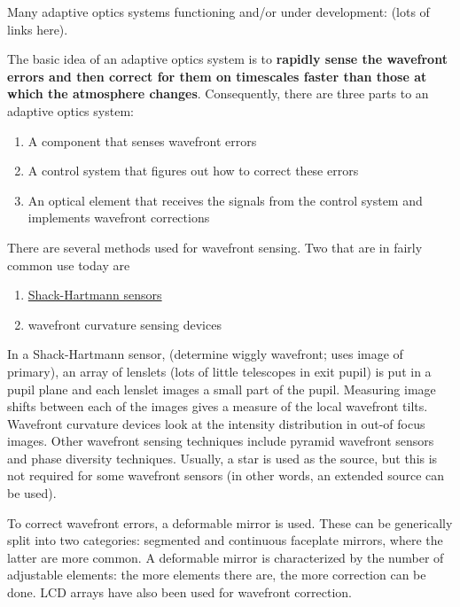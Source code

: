 \documentclass[12pt]{article}
\newcommand{\mynotes}[1]{\textcolor{myBlue}{#1}}
\begin{document}
Many adaptive optics systems functioning and/or under development:
(lots of links here).

The basic idea of an adaptive optics system is to \textbf{rapidly sense the
wavefront errors and then correct for them on timescales faster
than those at which the atmosphere changes}. Consequently, there are
three parts to an adaptive optics system:
\begin{enumerate}
    \item A component that senses wavefront errors
    \item A control system that figures out how to correct these errors
    \item An optical element that receives the signals from the
        control system and implements wavefront corrections
\end{enumerate}
There are several methods used for wavefront sensing. Two that are in
fairly common use today are
\begin{enumerate}
    \item \href{%
        http://astronomy.nmsu.edu/holtz/a535/html/diagrams/a535/beckers3.htm}
        {Shack-Hartmann sensors}
    \item wavefront curvature sensing devices
\end{enumerate}
In a Shack-Hartmann sensor,
\mynotes{(determine wiggly wavefront; uses image of primary)}, an array of
lenslets \mynotes{(lots of little telescopes in exit pupil)}
is put in a pupil plane and each
lenslet images a small part of the pupil. Measuring image shifts between each
of the images gives a measure of the local wavefront tilts. Wavefront curvature
devices look at the intensity distribution in out-of focus images. Other
wavefront sensing techniques include pyramid wavefront sensors and phase
diversity techniques. Usually, a star is used as the source, but this is not
required for some wavefront sensors (in other words, an extended source can be
used).

To correct wavefront errors, a deformable mirror is used. These can be
generically split into two categories: segmented and continuous faceplate
mirrors, where the latter are more common. A deformable mirror is
characterized by the number of adjustable elements: the more elements there
are, the more correction can be done. LCD arrays have also been used for
wavefront correction.
\end{document}
